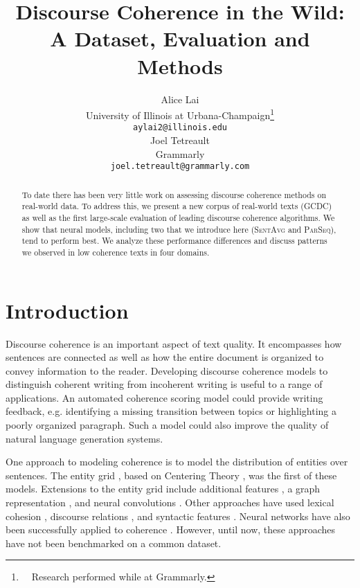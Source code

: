 \documentclass[11pt,a4paper]{article}
\title{Discourse Coherence in the Wild: A Dataset, Evaluation and Methods}
\author{Alice Lai\\
University of Illinois at Urbana-Champaign\thanks{\ \ Research performed while at Grammarly.}\\
 {\tt aylai2@illinois.edu} \\\And
Joel Tetreault \\
  Grammarly  \\
{\tt joel.tetreault@grammarly.com} \\}
\date{}
\newcommand \parseq{\textsc{ParSeq}\xspace}
\newcommand \sentavg{\textsc{SentAvg}\xspace}
\newcommand \dataset{\textsc{GCDC}\xspace}
\begin{document}
\maketitle

\begin{abstract}
To date there has been very little work on assessing discourse coherence methods on real-world data.  To address this, we present a new corpus of real-world texts (\dataset) as well as the first large-scale evaluation of leading discourse coherence algorithms. We show that neural models, including two that we introduce here (\sentavg and \parseq), tend to perform best.  
We analyze these performance differences and discuss patterns we observed in low coherence texts in four domains.


\end{abstract}


\section{Introduction}

Discourse coherence is an important aspect of text quality. It encompasses how  sentences are connected as well as how the entire document is organized to convey information to the reader.
Developing discourse coherence models to distinguish coherent writing from incoherent writing is useful to a range of applications.  An automated coherence scoring model could provide writing feedback, e.g. identifying a missing transition between topics or highlighting a poorly organized paragraph.  Such a model could also improve the quality of natural language generation systems.

One approach to modeling coherence is to model the distribution of entities over sentences. The entity grid \cite{barzilay-lapata:2005:ACL}, based on Centering Theory \cite{Grosz:1995}, was the first of these models. Extensions to the entity grid include additional features \cite{elsner-charniak:2008:ACLShort,elsner-charniak:2011:ACL,feng-lin-hirst:2014:Coling}, a graph representation \cite{guinaudeau-strube:2013:ACL2013,mesgar-strube:2015:*SEM2015}, and neural convolutions \cite{nguyen-joty:2017:ACL}. 
Other approaches have used lexical cohesion \cite{Morris:1991,somasundaran-burstein-chodorow:2014:Coling}, discourse relations \cite{lin-ng-kan:2011:ACL-HLT2011,feng-lin-hirst:2014:Coling}, and syntactic features \cite{louis-nenkova:2012:EMNLP-CoNLL}. Neural networks have also been successfully applied to coherence \cite{li-hovy:2014:EMNLP,nguyen-joty:2017:ACL,li-jurafsky:2017:EMNLP}.
However, until now, these approaches have not been benchmarked on a common dataset.
\end{document}
